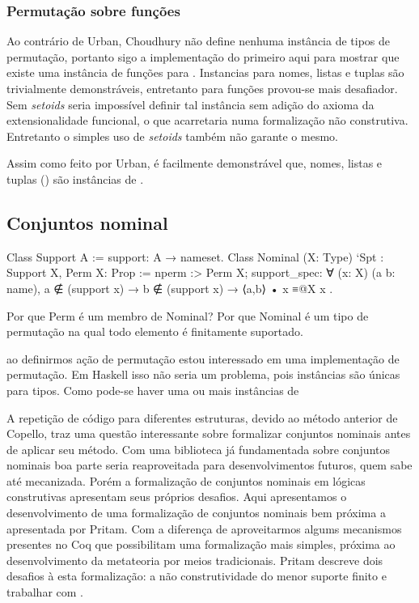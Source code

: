\subsubsection{Permutação sobre funções}
Ao contrário de Urban, Choudhury não define nenhuma instância de tipos de permutação, portanto sigo a implementação do primeiro aqui para mostrar que existe uma instância de funções para . Instancias para nomes, listas e tuplas são trivialmente demonstráveis, entretanto para funções provou-se mais desafiador. Sem \textit{setoids} seria impossível definir tal instância sem adição do axioma da extensionalidade funcional, o que acarretaria numa formalização não construtiva. Entretanto o simples uso de \textit{setoids} também não garante o mesmo.



Assim como feito por Urban, é facilmente demonstrável que, nomes, listas e tuplas () são instâncias de .


\subsection{Conjuntos nominal}
\begin{coqcode}
Class Support A := support: A → nameset.
Class Nominal (X: Type) `{Spt : Support X, Perm X}: Prop := {
   nperm :> Perm X;
   support_spec: ∀ (x: X) (a b: name),
      a ∉ (support x) → b ∉ (support x) → ⟨a,b⟩ • x ≡@{X} x
}.
\end{coqcode}

Por que Perm é um membro de Nominal? Por que Nominal é um tipo de permutação na qual todo elemento é finitamente suportado.


   ao definirmos ação de permutação estou interessado em uma implementação de permutação. Em Haskell isso não seria um problema, pois instâncias são únicas para tipos. Como pode-se haver uma ou mais instâncias de \coqinline{}

A repetição de código para diferentes estruturas, devido ao método anterior de Copello, traz uma questão interessante sobre formalizar conjuntos nominais antes de aplicar seu método. Com uma biblioteca já fundamentada sobre conjuntos nominais boa parte seria reaproveitada para desenvolvimentos futuros, quem sabe até mecanizada. Porém a formalização de conjuntos nominais em lógicas construtivas apresentam seus próprios desafios. Aqui apresentamos o desenvolvimento de uma formalização de conjuntos nominais bem próxima a apresentada por Pritam. Com a diferença de aproveitarmos algums mecanismos presentes no Coq que possibilitam uma formalização mais simples, próxima ao desenvolvimento da metateoria por meios tradicionais. Pritam descreve dois desafios à esta formalização: a não construtividade do menor suporte finito e trabalhar com \setoids.

